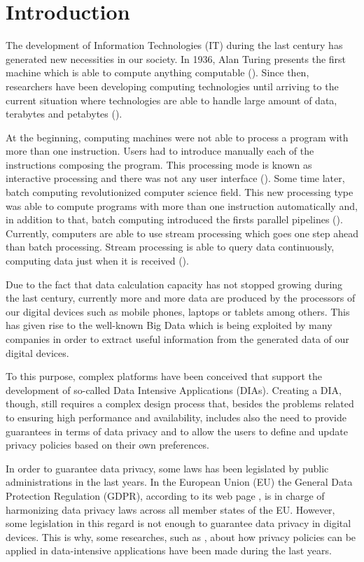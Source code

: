 \chapter[Introduction]{Introduction}
\label{sec:introduction}

The development of Information Technologies (IT) during the last century has generated new necessities in our society. In 1936, Alan Turing presents the first machine which is able to compute anything computable (\cite{computinghistory}). Since then, researchers have been developing computing technologies until arriving to the current situation where technologies are able to handle large amount of data, terabytes and petabytes (\cite{cloudcomputing}).

At the beginning, computing machines were not able to process a program with more than one instruction. Users had to introduce manually each of the instructions composing the program. This processing mode is known as interactive processing and there was not any user interface (\cite{interactiveprocessing}). Some time later, batch computing revolutionized computer science field. This new processing type was able to compute programs with more than one instruction automatically and, in addition to that, batch computing introduced the firsts parallel pipelines (\cite{interactiveprocessing}). Currently, computers are able to use stream processing which goes one step ahead than batch processing. Stream processing is able to query data continuously, computing data just when it is received (\cite{streamprocessing}).

Due to the fact that data calculation capacity has not stopped growing during the last century, currently more and more data are produced by the processors of our digital devices such as mobile phones, laptops or tablets among others. This has given rise to the well-known Big Data which is being exploited by many companies in order to extract useful information from the generated data of our digital devices.

To this purpose, complex platforms have been conceived that support the development of so-called Data Intensive Applications (DIAs). Creating a DIA, though, still requires a complex design process that, besides the problems related to ensuring high performance and availability, includes also the need to provide guarantees in terms of data privacy and to allow the users to define and update privacy policies based on their own preferences.

In order to guarantee data privacy, some laws has been legislated by public administrations in the last years. In the European Union (EU) the General Data Protection Regulation (GDPR), according to its web page \cite{gdprwebpage}, is in charge of harmonizing data privacy laws across all member states of the EU. However, some legislation in this regard is not enough to guarantee data privacy in digital devices. This is why, some researches, such as \cite{privacypoliciesarticle}, about how privacy policies can be applied in data-intensive applications have been made during the last years.

